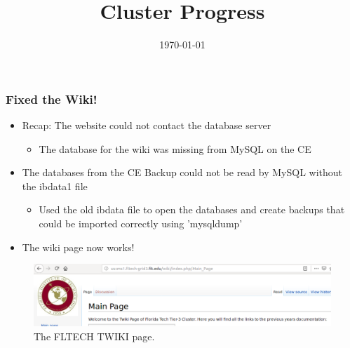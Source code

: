 \documentclass{beamer}
\title{Cluster Progress}
\date{\today}
\begin{document}

\begin{frame}
\titlepage
\end{frame}



\begin{frame}

  \frametitle{Fixed the Wiki!}
  \begin{itemize}
  \item Recap: The website could not contact the database server
    \begin{itemize}
    \item The database for the wiki was missing from MySQL on the CE
    \end{itemize}
  \item The databases from the CE Backup could not be read by MySQL without the ibdata1 file
    \begin{itemize}
    \item Used the old ibdata file to open the databases and create backups that could be imported correctly using 'mysqldump'
    \end{itemize}
    \item The wiki page now works!     
    \end{itemize}
  \begin{figure}[H]
    \begin{center}
      \includegraphics[scale=0.3]{wiki.png}
    \end{center}
    \caption{The FLTECH TWIKI page.}
  \end{figure}
  
\end{frame}


\end{document}
